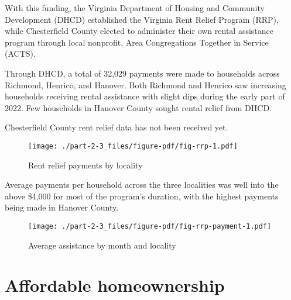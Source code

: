 \documentclass[
  letterpaper,
  DIV=11,
  numbers=noendperiod]{scrreprt}
\begin{document}
With this funding, the Virginia Department of Housing and Community
Development (DHCD) established the Virginia Rent Relief Program (RRP),
while Chesterfield County elected to administer their own rental
assistance program through local nonprofit, Area Congregations Together
in Service (ACTS).

Through DHCD, a total of 32,029 payments were made to households across
Richmond, Henrico, and Hanover. Both Richmond and Henrico saw increasing
households receiving rental assistance with slight dips during the early
part of 2022. Few households in Hanover County sought rental relief from
DHCD.

\begin{tcolorbox}[enhanced jigsaw, colback=white, colbacktitle=quarto-callout-warning-color!10!white, bottomrule=.15mm, opacitybacktitle=0.6, colframe=quarto-callout-warning-color-frame, breakable, opacityback=0, bottomtitle=1mm, titlerule=0mm, coltitle=black, leftrule=.75mm, left=2mm, title=\textcolor{quarto-callout-warning-color}{\faExclamationTriangle}\hspace{0.5em}{Warning}, toptitle=1mm, arc=.35mm, rightrule=.15mm, toprule=.15mm]
Chesterfield County rent relief data has not been received yet.
\end{tcolorbox}

\begin{figure}

{\centering \texttt{[image: ./part-2-3\_files/figure-pdf/fig-rrp-1.pdf]}

}

\caption{\label{fig-rrp}Rent relief payments by locality}

\end{figure}

Average payments per household across the three localities was well into
the above \$4,000 for most of the program's duration, with the highest
payments being made in Hanover County.

\begin{figure}

{\centering \texttt{[image: ./part-2-3\_files/figure-pdf/fig-rrp-payment-1.pdf]}

}

\caption{\label{fig-rrp-payment}Average assistance by month and
locality}

\end{figure}

\hypertarget{affordable-homeownership}{%
\section{Affordable homeownership}\label{affordable-homeownership}}
\end{document}
